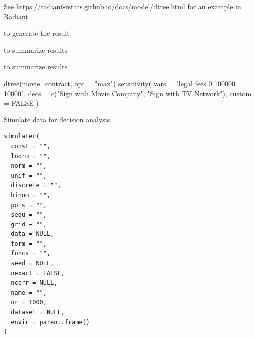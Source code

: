 \documentclass[a4paper]{book}
\begin{document}
%
\begin{Details}
See \url{https://radiant-rstats.github.io/docs/model/dtree.html} for an example in Radiant
\end{Details}
%
\begin{SeeAlso}
 to generate the result

 to summarize results

 to summarize results
\end{SeeAlso}
%
\begin{Examples}
\begin{ExampleCode}
dtree(movie_contract, opt = "max") %
  sensitivity(
    vars = "legal fees 0 100000 10000",
    decs = c("Sign with Movie Company", "Sign with TV Network"),
    custom = FALSE
  )

\end{ExampleCode}
\end{Examples}
%
\begin{Description}
Simulate data for decision analysis
\end{Description}
%
\begin{Usage}
\begin{verbatim}
simulater(
  const = "",
  lnorm = "",
  norm = "",
  unif = "",
  discrete = "",
  binom = "",
  pois = "",
  sequ = "",
  grid = "",
  data = NULL,
  form = "",
  funcs = "",
  seed = NULL,
  nexact = FALSE,
  ncorr = NULL,
  name = "",
  nr = 1000,
  dataset = NULL,
  envir = parent.frame()
)
\end{verbatim}
\end{Usage}
%
\end{document}
